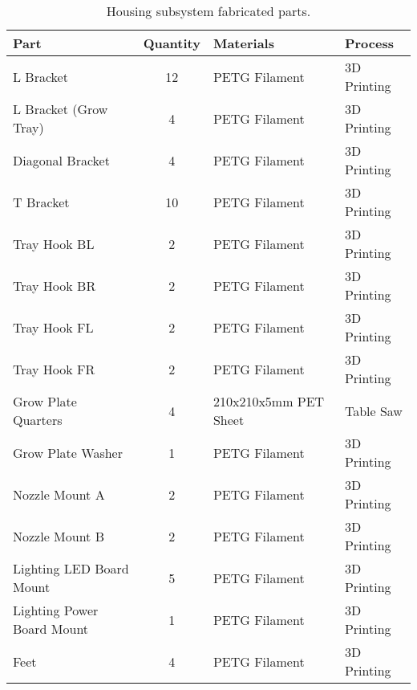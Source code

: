 \begin{table}[!ht]
    \centering
    \begin{tabular}{|l|c|l|l|}
    \hline
        Part                        & Quantity  & Materials             & Process           \\ \hline
        L Bracket                   & 12        & PETG Filament         & 3D Printing       \\ \hline
        L Bracket (Grow Tray)       & 4         & PETG Filament         & 3D Printing       \\ \hline
        Diagonal Bracket            & 4         & PETG Filament         & 3D Printing       \\ \hline
        T Bracket                   & 10        & PETG Filament         & 3D Printing       \\ \hline
        Tray Hook BL                & 2         & PETG Filament         & 3D Printing       \\ \hline
        Tray Hook BR                & 2         & PETG Filament         & 3D Printing       \\ \hline
        Tray Hook FL                & 2         & PETG Filament         & 3D Printing       \\ \hline
        Tray Hook FR                & 2         & PETG Filament         & 3D Printing       \\ \hline
        Grow Plate Quarters         & 4         & 210x210x5mm PET Sheet & Table Saw         \\ \hline
        Grow Plate Washer           & 1         & PETG Filament         & 3D Printing       \\ \hline
        Nozzle Mount A              & 2         & PETG Filament         & 3D Printing       \\ \hline
        Nozzle Mount B              & 2         & PETG Filament         & 3D Printing       \\ \hline
        Lighting LED Board Mount    & 5         & PETG Filament         & 3D Printing       \\ \hline
        Lighting Power Board Mount  & 1         & PETG Filament         & 3D Printing       \\ \hline
        Feet                        & 4         & PETG Filament         & 3D Printing       \\ \hline
    \end{tabular}
    \caption{Housing subsystem fabricated parts.}
    \label{tab:housing_fabrication}
\end{table}

